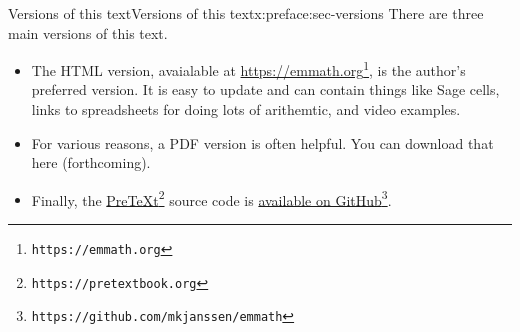 \documentclass[oneside,10pt,]{book}
\numberwithin{equation}{section}
\begin{document}
%
%
\typeout{************************************************}
\typeout{************************************************}
%
\begin{preface}{Versions of this text}{}{Versions of this text}{}{}{x:preface:sec-versions}
There are three main versions of this text.%
%
\begin{itemize}[label=\textbullet]
\item{}The HTML version, avaialable at \href{https://emmath.org}{https:\slash{}\slash{}emmath.org}\footnote{\nolinkurl{https://emmath.org}\label{g:fn:idp105544742317456}}, is the author's preferred version. It is easy to update and can contain things like Sage cells, links to spreadsheets for doing lots of arithemtic, and video examples.%
\item{}For various reasons, a PDF version is often helpful. You can download that here (forthcoming).%
\item{}Finally, the \href{https://pretextbook.org}{PreTeXt}\footnote{\nolinkurl{https://pretextbook.org}\label{g:fn:idp105544742318736}} source code is \href{https://github.com/mkjanssen/emmath}{available on GitHub}\footnote{\nolinkurl{https://github.com/mkjanssen/emmath}\label{g:fn:idp105544742319504}}.%
\end{itemize}
\end{preface}
%
%
\typeout{************************************************}
\typeout{************************************************}
%
\end{document}
